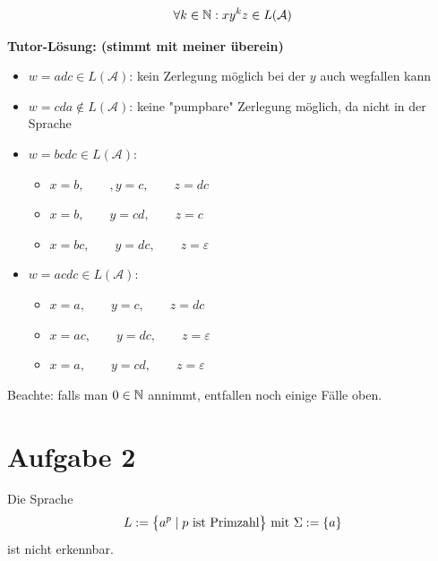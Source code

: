 \documentclass[12pt,a4paper]{article}
\newcommand{\A}{\mathcal{A}}
\begin{document}
\begin{align}\label{eqAufgabe1}
	\forall k\in\N:xy^kz\in L(\A)
\end{align}

\textbf{Tutor-Lösung: (stimmt mit meiner überein)}
\begin{itemize}
	\item $w=adc\in L(\A)$: kein Zerlegung möglich bei der $y$ auch wegfallen kann
	\item $w=cda\not\in L(\A)$: keine "pumpbare" Zerlegung möglich, da nicht in der Sprache
	\item $w=bcdc\in L(\A)$:
	\begin{itemize}
		\item $x=b,\qquad,y=c,\qquad z=dc$
		\item $x=b,\qquad y=cd,\qquad z=c$
		\item $x=bc,\qquad y=dc,\qquad z=\varepsilon$
	\end{itemize}
	\item $w=acdc\in L(\A)$:
	\begin{itemize}
		\item $x=a,\qquad y=c,\qquad z=dc$
		\item $x=ac,\qquad y=dc,\qquad z=\varepsilon$
		\item $x=a,\qquad y=cd,\qquad z=\varepsilon$ 
	\end{itemize}
\end{itemize}

Beachte: falls man $0\in\N$ annimmt, entfallen noch einige Fälle oben.

\section*{Aufgabe 2}
Die Sprache
\begin{align*}
	L:=\big\lbrace a^p\mid p\text{ ist Primzahl}\big\rbrace\mit\Sigma:=\lbrace a\rbrace
\end{align*}
ist nicht erkennbar.
\end{document}
